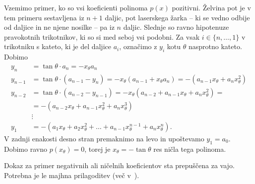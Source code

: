 \begin{dokaz}
    Vzemimo primer, ko so vsi koeficienti polinoma $p(x)$ pozitivni. Želvina pot je v tem primeru sestavljena iz $n+1$ daljic, pot laserskega žarka -- ki se vedno odbije od daljice in ne njene nosilke -- pa iz $n$ daljic. Slednje so ravno hipotenuze pravokotnih trikotnikov, ki so si med seboj vsi podobni. Za vsak $i \in \{n, \ldots, 1\}$ v trikotniku s kateto, ki je del daljice $a_i$, označimo z $y_i$ kotu $\theta$ nasprotno kateto. Dobimo
    \begin{align*}
        y_n &= \tan \theta \cdot a_n = - x_{\theta} a_n \\
        y_{n-1} &= \tan \theta \cdot (a_{n-1} - y_n) = - x_{\theta} (a_{n-1} + x_{\theta} a_n) = - (a_{n-1} x_{\theta} + a_n x_{\theta}^2)\\
        y_{n-2} &= \tan \theta \cdot (a_{n-2} - y_{n-1}) = - x_{\theta} (a_{n-2} + a_{n-1} x_{\theta} + a_n x_{\theta}^2) = \\
        &= - (a_{n-2} x_{\theta} + a_{n-1} x_{\theta}^2 + a_n x_{\theta}^3) \\
        &\vdots \\
        y_1 &= - (a_1 x_{\theta} + a_2 x_{\theta}^2 + \ldots + a_{n-1} x_{\theta}^{n-1} + a_n x_{\theta}^n).
    \end{align*}
    V zadnji enakosti desno stran premaknimo na levo in upoštevamo $y_1 = a_0$. Dobimo ravno $p(x_{\theta}) = 0$, torej je $x_{\theta} = - \tan \theta$ res ničla tega polinoma.

    Dokaz za primer negativnih ali ničelnih koeficientov sta prepuščena za vajo. Potrebna je le majhna prilagoditev (več v~\cite[str.\ 36]{zore2022}).

\end{dokaz}

